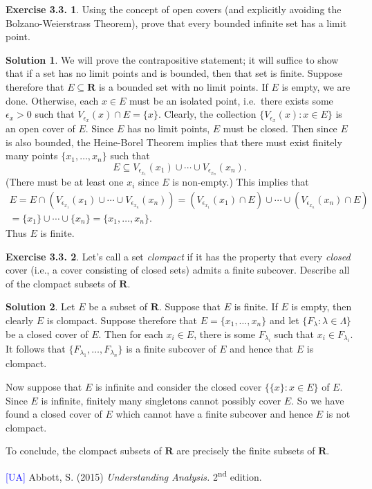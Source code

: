 \documentclass[12pt]{article}
\theoremstyle{definition}
\theoremstyle{exercise}
\newtheorem{exercise}{Exercise 3.3.}
\theoremstyle{solution}
\newtheorem*{solution}{Solution}
\newcommand{\ts}{\textsuperscript}
\newcommand{\R}{\mathbf{R}}
\begin{document}
\begin{exercise}
\label{ex:12}
    Using the concept of open covers (and explicitly avoiding the Bolzano-Weierstrass Theorem), prove that every bounded infinite set has a limit point.
\end{exercise}

\begin{solution}
    We will prove the contrapositive statement; it will suffice to show that if a set has no limit points and is bounded, then that set is finite. Suppose therefore that \( E \subseteq \R \) is a bounded set with no limit points. If \( E \) is empty, we are done. Otherwise, each \( x \in E \) must be an isolated point, i.e.\ there exists some \( \epsilon_x > 0 \) such that \( V_{\epsilon_x}(x) \cap E = \{ x \} \). Clearly, the collection \( \{ V_{\epsilon_x}(x) : x \in E \} \) is an open cover of \( E \). Since \( E \) has no limit points, \( E \) must be closed. Then since \( E \) is also bounded, the Heine-Borel Theorem implies that there must exist finitely many points \( \{ x_1, \ldots, x_n \} \) such that
    \[
        E \subseteq V_{\epsilon_{x_1}}(x_1) \cup \cdots \cup V_{\epsilon_{x_n}}(x_n).
    \]
    (There must be at least one \( x_i \) since \( E \) is non-empty.) This implies that
    \begin{multline*}
        E = E \cap (V_{\epsilon_{x_1}}(x_1) \cup \cdots \cup V_{\epsilon_{x_n}}(x_n)) = (V_{\epsilon_{x_1}}(x_1) \cap E) \cup \cdots \cup (V_{\epsilon_{x_n}}(x_n) \cap E) \\ = \{ x_1 \} \cup \cdots \cup \{ x_n \} = \{ x_1, \ldots, x_n \}.
    \end{multline*}
    Thus \( E \) is finite.
\end{solution}

\begin{exercise}
\label{ex:13}
    Let's call a set \textit{clompact} if it has the property that every \textit{closed} cover (i.e., a cover consisting of closed sets) admits a finite subcover. Describe all of the clompact subsets of \( \R \).
\end{exercise}

\begin{solution}
    Let \( E \) be a subset of \( \R \). Suppose that \( E \) is finite. If \( E \) is empty, then clearly \( E \) is clompact. Suppose therefore that \( E = \{ x_1, \ldots, x_n \} \) and let \( \{ F_{\lambda} : \lambda \in \Lambda \} \) be a closed cover of \( E \). Then for each \( x_i \in E \), there is some \( F_{\lambda_i} \) such that \( x_i \in F_{\lambda_i} \). It follows that \( \{ F_{\lambda_1}, \ldots, F_{\lambda_n} \} \) is a finite subcover of \( E \) and hence that \( E \) is clompact.

    Now suppose that \( E \) is infinite and consider the closed cover \( \{ \{ x \} : x \in E \} \) of \( E \). Since \( E \) is infinite, finitely many singletons cannot possibly cover \( E \). So we have found a closed cover of \( E \) which cannot have a finite subcover and hence \( E \) is not clompact.

    To conclude, the clompact subsets of \( \R \) are precisely the finite subsets of \( \R \).
\end{solution}

\noindent \hrulefill

\noindent \hypertarget{ua}{\textcolor{blue}{[UA]} Abbott, S. (2015) \textit{Understanding Analysis.} 2\ts{nd} edition.}
\end{document}
